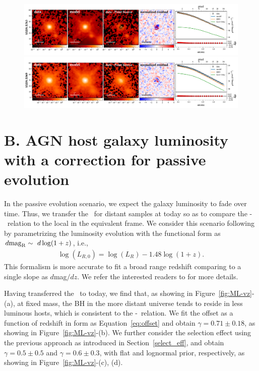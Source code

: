 \documentclass[apj]{emulateapj}
\begin{document}
\begin{figure}
\centering
{
\includegraphics[height=0.25\textwidth]{fig/best_fit_SXDS-X763_SB_profile.pdf}
\includegraphics[height=0.25\textwidth]{fig/best_fit_SXDS-X969_SB_profile.pdf}
}
\end{figure} 

\clearpage
\section{B. AGN host galaxy luminosity with a correction for passive evolution}\label{sec:ml-ev}
In the passive evolution scenario, we expect the galaxy luminosity to fade over time. Thus, we transfer the \lhost\ for distant samples at today so as to compare the \mbh-\lhost\ relation to the local in the equivalent frame.
We consider this scenario following \citet{Ding2017b} by parametrizing the luminosity evolution with the functional form as
$d{\rm mag}_{\rm R}\sim~d\log(1+z)$, i.e.,
\begin{eqnarray}
\label{eq:L_relation}
\log(L_{R,0})=\log(L_{R}) - 1.48 \log (1+z).
\end{eqnarray} 
This formalism is more accurate to fit a broad range redshift comparing to a single slope as $d$mag$/dz$. We refer the interested readers to \citet[][section 5.4]{Ding2017b} for more details.

Having transferred the \lhost\ to today, we find that, as showing in Figure~\ref{fig:ML-vz}-(a), at fixed mass, the BH in the more distant universe tends to reside in less luminous hosts, which is consistent to the \mbh-\smass\ relation. We fit the offset as a function of redshift in form as Equation~\ref{eq:offset} and obtain $\gamma = 0.71 \pm 0.18$, as showing in Figure~\ref{fig:ML-vz}-(b). We further consider the selection effect using the previous approach as introduced in Section~\ref{select_eff}, and obtain $\gamma = 0.5\pm0.5$ and $\gamma = 0.6\pm0.3$, with flat and lognormal prior, respectively, as showing in Figure~\ref{fig:ML-vz}-(c), (d).
\end{document}
